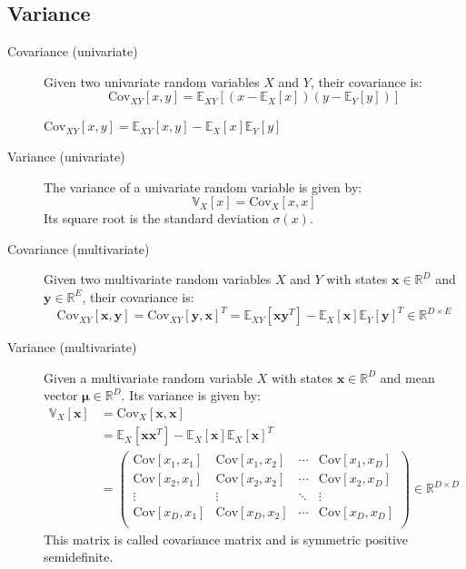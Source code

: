\subsection{Variance}
\begin{description}
    \item[Covariance (univariate)] 
        Given two univariate random variables $X$ and $Y$, their covariance is:
        \[ \text{Cov}_{XY}[x, y] = \mathbb{E}_{XY}[(x - \mathbb{E}_X[x])(y - \mathbb{E}_Y[y])] \]

        \begin{lemma} 
            $\text{Cov}_{XY}[x, y] = \mathbb{E}_{XY}[x, y] - \mathbb{E}_{X}[x]\mathbb{E}_{Y}[y]$
        \end{lemma}

    \item[Variance (univariate)] 
        The variance of a univariate random variable is given by:
        \[ \mathbb{V}_X[x] = \text{Cov}_X[x, x] \]
        Its square root is the standard deviation $\sigma(x)$.

    \item[Covariance (multivariate)] 
        Given two multivariate random variables 
        $X$ and $Y$ with states $\bm{x} \in \mathbb{R}^D$ and $\bm{y} \in \mathbb{R}^E$,
        their covariance is:
        \[ 
            \text{Cov}_{XY}[\bm{x}, \bm{y}] = \text{Cov}_{XY}[\bm{y}, \bm{x}]^T =
            \mathbb{E}_{XY}[\bm{xy}^T] - \mathbb{E}_{X}[\bm{x}]\mathbb{E}_{Y}[\bm{y}]^T \in \mathbb{R}^{D \times E}
        \]


    \item[Variance (multivariate)] 
        Given a multivariate random variable $X$ with 
        states $\bm{x} \in \mathbb{R}^D$ and mean vector $\bm{\mu} \in \mathbb{R}^D$.
        Its variance is given by:
        \[
            \begin{split}
                \mathbb{V}_X[\bm{x}] &= \text{Cov}_X[\bm{x}, \bm{x}] \\
                    &= \mathbb{E}_X[\bm{xx}^T] - \mathbb{E}_X[\bm{x}]\mathbb{E}_X[\bm{x}]^T \\
                    &= 
                    \begin{pmatrix}
                        \text{Cov}[x_1, x_1] & \text{Cov}[x_1, x_2] & \cdots & \text{Cov}[x_1, x_D] \\
                        \text{Cov}[x_2, x_1] & \text{Cov}[x_2, x_2] & \cdots & \text{Cov}[x_2, x_D] \\
                        \vdots & \vdots & \ddots & \vdots \\
                        \text{Cov}[x_D, x_1] & \text{Cov}[x_D, x_2] & \cdots & \text{Cov}[x_D, x_D] \\
                    \end{pmatrix} \in \mathbb{R}^{D \times D}
            \end{split}
        \]
        This matrix is called covariance matrix and is symmetric positive semidefinite.


\end{description}
